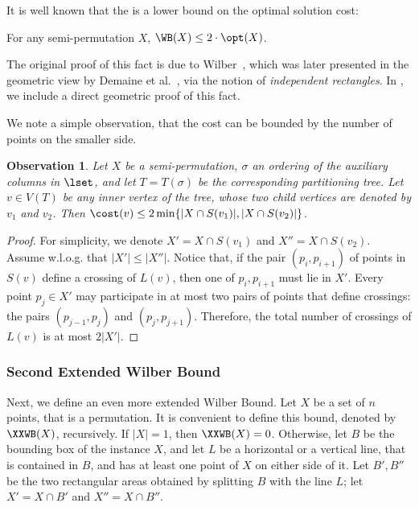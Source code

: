 \documentclass{toc}
\newtheorem{myobs}[theorem]{Observation}
\begin{document}
It is well known that the \WBone is a lower bound on the optimal solution cost:

\begin{claim}\label{claim: bounding WB by OPT}
	For any semi-permutation $X$, $\WB(X)\leq 2 \cdot \opt(X)$.
\end{claim} 

The original proof of this fact is due to Wilber~\cite{wilber}, which was later presented in the geometric view by Demaine et al.~\cite{DHIKP09}, via the notion of \emph{independent rectangles}. In , we include a direct geometric proof of this fact. 

We note a simple observation, that the cost can be bounded by the number of points on the smaller side.
 
\begin{myobs}\label{obs: number of crossings at most min of both sides}
	Let $X$ be a semi-permutation, $\sigma$ an ordering of the auxiliary columns in $\lset$, and let $T=T({\sigma})$ be the corresponding partitioning tree. Let $v\in V(T)$ be any inner vertex of the tree, whose two child vertices are denoted by $v_1$ and $v_2$. 
Then $\cost(v) \leq 2 \min \{|X \cap S(v_1)|, |X \cap S(v_2)| \}$. 
\end{myobs}
\begin{proof}
For simplicity, we denote $X' =  X \cap S(v_1)$ and $X'' = X \cap S(v_2)$. 
Assume w.l.o.g. that $|X'|\leq |X''|$. Notice that, if the pair $(p_i,p_{i+1})$ of points in $S(v)$ define a crossing of $L(v)$, then one of $p_i,p_{i+1}$ must lie in $X'$. 
Every point $p_j\in X'$ may participate in at most two pairs of points that define crossings: the pairs $(p_{j-1},p_j)$ and $(p_j,p_{j+1})$. 
Therefore, the total number of crossings of $L(v)$ is at most $2|X'|$.
\end{proof}



%

%
%
%
%
%
%
%











\iffalse 
\subsubsection{Second Extended Wilber Bound}
Next, we define an even more extended Wilber Bound. Let $X$ be a set of $n$ points, that is a permutation. It is convenient to define this bound, denoted by $\XXWB(X)$, recursively. If $|X|=1$, then $\XXWB(X)=0$. Otherwise, let $B$ be the bounding box of the instance $X$, and let $L$ be a horizontal or a vertical line, that is contained in $B$, and has at least one point of $X$ on either side of it. Let $B',B''$ be the two rectangular areas obtained by splitting $B$ with the line $L$; let $X'=X\cap B'$ and $X''=X\cap B''$.
\end{document}
